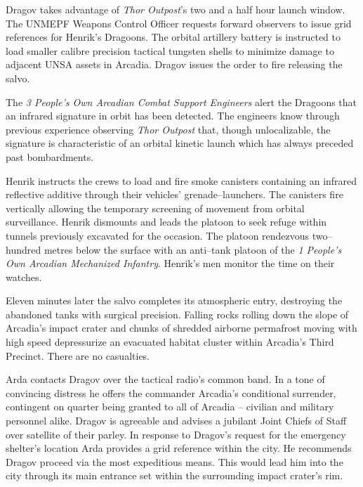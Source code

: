 Dragov takes advantage of {\it Thor Outpost}'s two and a half hour launch window. The UNMEPF Weapons Control Officer requests forward observers to issue grid references for Henrik's Dragoons. The orbital artillery battery is instructed to load smaller calibre precision tactical tungsten shells to minimize damage to adjacent UNSA assets in Arcadia. Dragov issues the order to fire releasing the salvo.

The {\it 3 People's Own Arcadian Combat Support Engineers} alert the Dragoons that an infrared signature in orbit has been detected. The engineers know through previous experience observing {\it Thor Outpost} that, though unlocalizable, the signature is characteristic of an orbital kinetic launch which has always preceded past bombardments.

Henrik instructs the crews to load and fire smoke canisters containing an infrared reflective additive through their vehicles' grenade--launchers. The canisters fire vertically allowing the temporary screening of movement from orbital surveillance. Henrik dismounts and leads the platoon to seek refuge within tunnels previously excavated for the occasion. The platoon rendezvous two--hundred metres below the surface with an anti--tank platoon of the {\it 1 People's Own Arcadian Mechanized Infantry}. Henrik's men monitor the time on their watches.

Eleven minutes later the salvo completes its atmospheric entry, destroying the abandoned tanks with surgical precision. Falling rocks rolling down the slope of Arcadia's impact crater and chunks of shredded airborne permafrost moving with high speed depressurize an evacuated habitat cluster within Arcadia's Third Precinct. There are no casualties.

Arda contacts Dragov over the tactical radio's common band. In a tone of convincing distress he offers the commander Arcadia's conditional surrender, contingent on quarter being granted to all of Arcadia -- civilian and military personnel alike. Dragov is agreeable and advises a jubilant Joint Chiefs of Staff over satellite of their parley. In response to Dragov's request for the emergency shelter's location Arda provides a grid reference within the city. He recommends Dragov proceed via the most expeditious means. This would lead him into the city through its main entrance set within the surrounding impact crater's rim.

